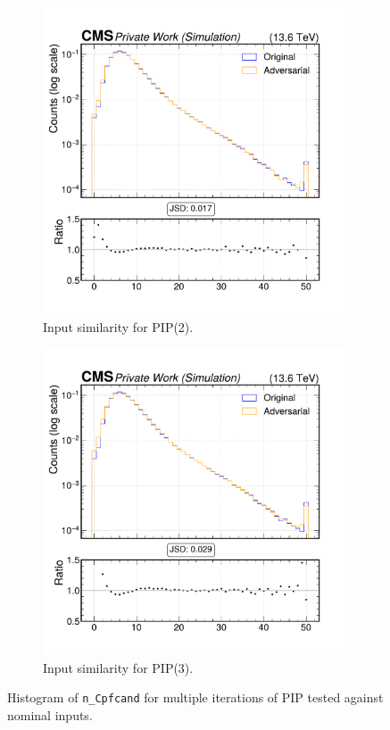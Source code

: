 \begin{figure}[h]
\begin{subfigure}[t]{0.32\textwidth}
    \includegraphics[width=\linewidth]{media/output/features/compare/intprob_2/cmp_global_features_n_Cpfcand.pdf}
    \caption{Input similarity for PIP(2).}
  \end{subfigure}\hfill
  \begin{subfigure}[t]{0.32\textwidth}
    \includegraphics[width=\linewidth]{media/output/features/compare/intprob_3/cmp_global_features_n_Cpfcand.pdf}
    \caption{Input similarity for PIP(3).}
  \end{subfigure}

  \caption{Histogram of \texttt{n\_Cpfcand} for multiple iterations of PIP tested against nominal inputs.}
  \label{fig:intprob_input_n_Cpfcand}
\end{figure}
